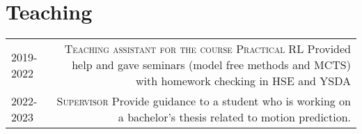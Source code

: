 \section*{\sectionformat Teaching}
\begin{tabular}{@{}L!{\VRule}R}
    2019-2022  {} &
    {\textsc{Teaching assistant for the course Practical RL}} Provided help and gave seminars (model free methods and MCTS) with homework checking in HSE and YSDA
\\
    2022-2023 {} 
    & {\textsc{Supervisor}} Provide guidance to a student who is working on a bachelor's thesis related to motion prediction.
\end{tabular}
